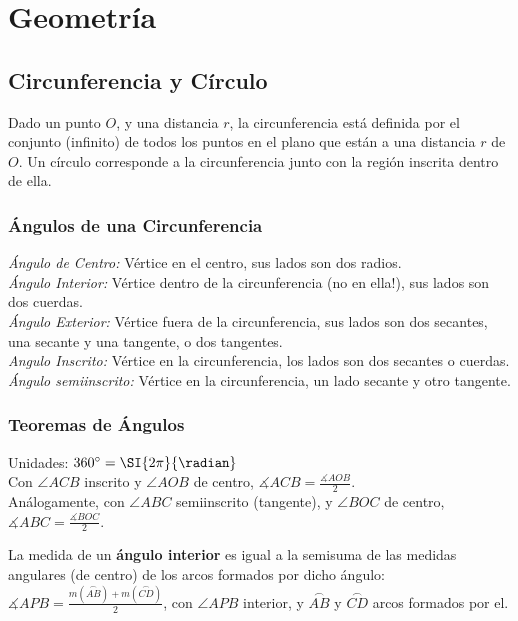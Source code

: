 \section{Geometría}
\def\svgwidth{\columnwidth}
\subsection{Circunferencia y Círculo}
Dado un punto $O$, y una distancia $r$, la circunferencia está definida por el conjunto (infinito) de todos los puntos en el plano que están a una distancia $r$ de $O$. Un círculo corresponde a la circunferencia junto con la región inscrita dentro de ella.\\

\subsubsection{Ángulos de una Circunferencia}
\textit{Ángulo de Centro:} Vértice en el centro, sus lados son dos radios.\\
\textit{Ángulo Interior:} Vértice dentro de la circunferencia (no en ella!), sus lados son dos cuerdas.\\
\textit{Ángulo Exterior:} Vértice fuera de la circunferencia, sus lados son dos secantes, una secante y una tangente, o dos tangentes.\\
\textit{Angulo Inscrito:} Vértice en la circunferencia, los lados son dos secantes o cuerdas.\\
\textit{Ángulo semiinscrito:} Vértice en la circunferencia, un lado secante y otro tangente.\\

\subsubsection{Teoremas de Ángulos}
Unidades: $360^{\circ} = \SI{2\pi}{\radian}$\\

Con $\angle ACB$ inscrito y $\angle AOB$ de centro,
$\measuredangle ACB = \frac{\measuredangle AOB}{2}$.\\
Análogamente, con $\angle ABC$ semiinscrito (tangente), y $\angle BOC$ de centro, $\measuredangle ABC = \frac{\measuredangle BOC}{2}$.

La medida de un \textbf{ángulo interior} es igual a la semisuma de las medidas angulares (de centro) de los arcos formados por dicho ángulo:\\
$\measuredangle APB = \frac{m(\stackrel\frown{AB}) + m(\stackrel\frown{CD})}{2}$, con $\angle APB$ interior, y $\stackrel\frown{AB}$ y $\stackrel\frown{CD}$ arcos formados por el.\\

